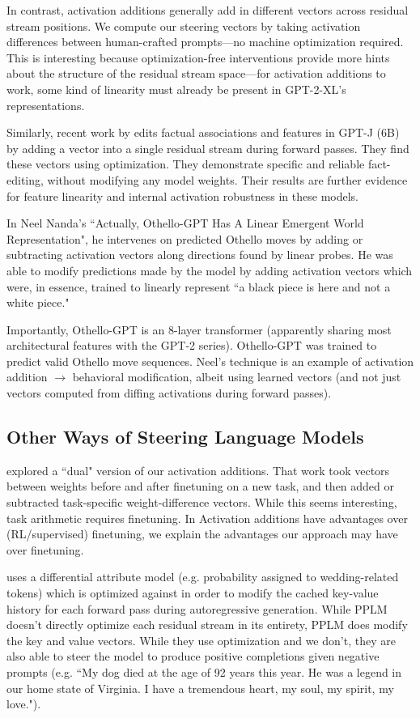 \documentclass[10pt]{article}
\begin{document}
In contrast, activation additions generally add in different vectors across residual stream positions. We compute our steering vectors by taking activation differences between human-crafted prompts—no machine optimization required. This is interesting because optimization-free interventions provide more hints about the structure of the residual stream space—for activation additions to work, some kind of linearity must already be present in GPT-2-XL's representations.

Similarly, recent work by \citet{hernandez2023inspecting} edits factual associations and features in GPT-J (6B) by adding a vector into a single residual stream during forward passes. They find these vectors using optimization. They demonstrate specific and reliable fact-editing, without modifying any model weights. Their results are further evidence for feature linearity and internal activation robustness in these models. 

In Neel Nanda's ``Actually, Othello-GPT Has A Linear Emergent World Representation", he intervenes on predicted Othello moves by adding or subtracting activation vectors along directions found by linear probes. He was able to modify predictions made by the model by adding activation vectors which were, in essence, trained to linearly represent ``a black piece is here and not a white piece."%

Importantly, Othello-GPT \citep{li2023emergent} is an 8-layer transformer (apparently sharing most architectural features with the GPT-2 series). Othello-GPT was trained to predict valid Othello move sequences. Neel's technique is an example of activation addition $\rightarrow$ behavioral modification, albeit using learned vectors (and not just vectors computed from diffing activations during forward passes).

\subsection{Other Ways of Steering Language Models}
\citet{ilharco2023editing} explored a ``dual" version of our activation additions. That work took vectors between weights before and after finetuning on a new task, and then added or subtracted task-specific weight-difference vectors. While this seems interesting, task arithmetic requires finetuning. In Activation additions have advantages over (RL/supervised) finetuning, we explain the advantages our approach may have over finetuning.

\citet{Dathathri2020Plug} uses a differential attribute model (e.g. probability assigned to wedding-related tokens) which is optimized against in order to modify the cached key-value history for each forward pass during autoregressive generation. While PPLM doesn't directly optimize each residual stream in its entirety, PPLM does modify the key and value vectors. While they use optimization and we don't, they are also able to steer the model to produce positive completions given negative prompts (e.g. ``My dog died at the age of 92 years this year. He was a legend in our home state of Virginia. I have a tremendous heart, my soul, my spirit, my love.").
\end{document}

